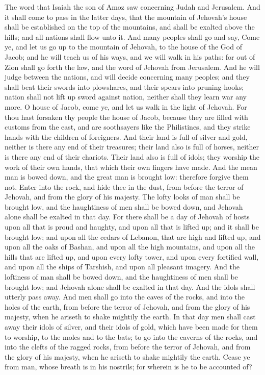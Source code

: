 The word that Isaiah the son of Amoz saw concerning Judah and Jerusalem.  And it shall come to pass in the latter days, that the mountain of Jehovah’s house shall be established on the top of the mountains, and shall be exalted above the hills; and all nations shall flow unto it. And many peoples shall go and say, Come ye, and let us go up to the mountain of Jehovah, to the house of the God of Jacob; and he will teach us of his ways, and we will walk in his paths: for out of Zion shall go forth the law, and the word of Jehovah from Jerusalem. And he will judge between the nations, and will decide concerning many peoples; and they shall beat their swords into plowshares, and their spears into pruning-hooks; nation shall not lift up sword against nation, neither shall they learn war any more.  O house of Jacob, come ye, and let us walk in the light of Jehovah. For thou hast forsaken thy people the house of Jacob, because they are filled with customs from the east, and are soothsayers like the Philistines, and they strike hands with the children of foreigners. And their land is full of silver and gold, neither is there any end of their treasures; their land also is full of horses, neither is there any end of their chariots. Their land also is full of idols; they worship the work of their own hands, that which their own fingers have made. And the mean man is bowed down, and the great man is brought low: therefore forgive them not. Enter into the rock, and hide thee in the dust, from before the terror of Jehovah, and from the glory of his majesty. The lofty looks of man shall be brought low, and the haughtiness of men shall be bowed down, and Jehovah alone shall be exalted in that day.  For there shall be a day of Jehovah of hosts upon all that is proud and haughty, and upon all that is lifted up; and it shall be brought low; and upon all the cedars of Lebanon, that are high and lifted up, and upon all the oaks of Bashan, and upon all the high mountains, and upon all the hills that are lifted up, and upon every lofty tower, and upon every fortified wall, and upon all the ships of Tarshish, and upon all pleasant imagery. And the loftiness of man shall be bowed down, and the haughtiness of men shall be brought low; and Jehovah alone shall be exalted in that day. And the idols shall utterly pass away. And men shall go into the caves of the rocks, and into the holes of the earth, from before the terror of Jehovah, and from the glory of his majesty, when he ariseth to shake mightily the earth. In that day men shall cast away their idols of silver, and their idols of gold, which have been made for them to worship, to the moles and to the bats; to go into the caverns of the rocks, and into the clefts of the ragged rocks, from before the terror of Jehovah, and from the glory of his majesty, when he ariseth to shake mightily the earth. Cease ye from man, whose breath is in his nostrils; for wherein is he to be accounted of? 

